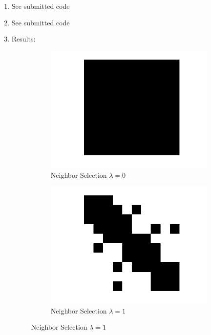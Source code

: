 \documentclass{article}
\begin{document}
\begin{enumerate}

\item
See submitted code

\item
See submitted code

\item
Results:
\begin{figure}[ht!]
\centering

\begin{subfigure}{.5\textwidth}
  \centering
  \includegraphics[width=.8\linewidth]{ns_0.png}
  \caption{Neighbor Selection $\lambda=0$}
\end{subfigure}%
\begin{subfigure}{.5\textwidth}
  \centering
  \includegraphics[width=.8\linewidth]{ns_1.png}
  \caption{Neighbor Selection $\lambda=1$}
\end{subfigure}


\end{figure}
\end{enumerate}
\end{document}
